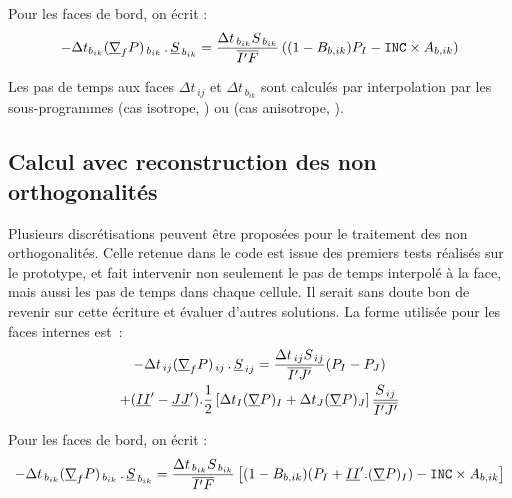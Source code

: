 Pour les faces de bord, on écrit :
\begin{equation}
\label{Base_Itrmas_eq_brdssrec}
-\Delta t_{b_{ik}}(\underline{\nabla}_f P)_{\,b_{ik}}\,.\,\underline{S}_{\,b_{ik}}=
\frac{\Delta t_{\,b_{ik}}S_{\,b_{ik}}}{\overline{I^\prime F}}
\left((1-B_{b,ik})P_I-\text{\texttt{INC}}\times A_{b,ik}\right)
\end{equation}

Les pas de temps aux faces $\Delta t_{\,ij}$ et $\Delta t_{\,b_{ik}}$ sont calculés
par interpolation par les sous-programmes  (cas isotrope,
) ou  (cas anisotrope, ).

\subsection*{Calcul avec reconstruction des non orthogonalités}
Plusieurs discrétisations peuvent être proposées pour le traitement des
non orthogonalités. Celle retenue dans le code est issue des premiers tests
réalisés sur le prototype, et fait intervenir non seulement le pas de temps
interpolé à la face, mais aussi les pas de temps dans chaque
cellule. Il
serait sans doute bon de revenir sur cette écriture et évaluer d'autres
solutions. La forme utilisée pour les faces internes est~:
\begin{multline}
\label{Base_Itrmas_eq_intavcrec}
-\Delta t_{\,ij}(\underline{\nabla}_f P)_{\,ij}\,.\,\underline{S}_{\,ij}=
\frac{\Delta t_{\,ij}S_{\,ij}}{\overline{I^\prime J^\prime}}(P_I-P_J)\\
+(\underline{II}^\prime-\underline{JJ}^\prime).\frac{1}{2}\left[
\Delta t_I(\underline{\nabla} P)_I+\Delta t_J(\underline{\nabla} P)_J\right]
\frac{S_{\,ij}}{\overline{I^\prime J^\prime}}
\end{multline}

Pour les faces de bord, on écrit :
\begin{equation}
\label{Base_Itrmas_eq_brdavcrec}
-\Delta t_{\,b_{ik}}(\underline{\nabla}_f P)_{\,b_{ik}}\,.\,\underline{S}_{\,b_{ik}}=
\frac{\Delta t_{\,b_{ik}} S_{\,b_{ik}}}{\overline{I^\prime F}}
\left[(1-B_{b,ik})(P_I+\underline{II}^\prime.(\underline{\nabla} P)_I)-\text{\texttt{INC}}\times A_{b,ik}\right]
\end{equation}

